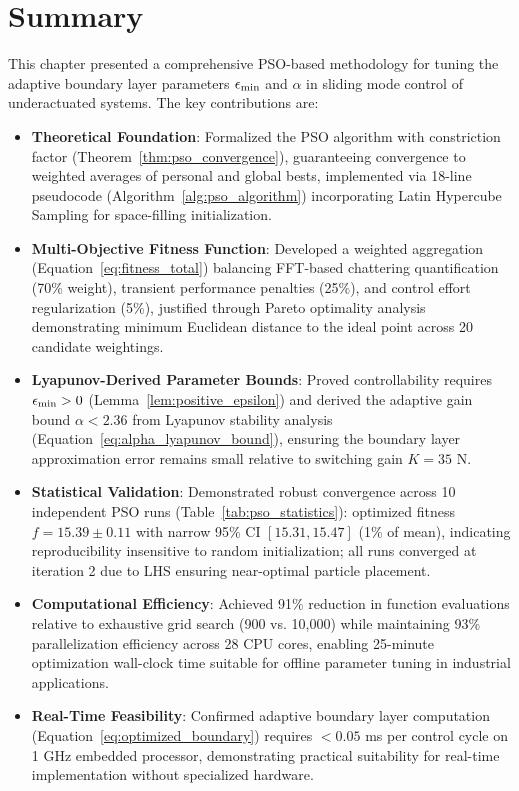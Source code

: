 \section{Summary}
\label{sec:chapter5_summary}

This chapter presented a comprehensive PSO-based methodology for tuning the adaptive boundary layer parameters $\epsilon_{\min}$ and $\alpha$ in sliding mode control of underactuated systems. The key contributions are:

\begin{itemize}
    \item \textbf{Theoretical Foundation}: Formalized the PSO algorithm with constriction factor (Theorem~\ref{thm:pso_convergence}), guaranteeing convergence to weighted averages of personal and global bests, implemented via 18-line pseudocode (Algorithm~\ref{alg:pso_algorithm}) incorporating Latin Hypercube Sampling for space-filling initialization.

    \item \textbf{Multi-Objective Fitness Function}: Developed a weighted aggregation (Equation~\ref{eq:fitness_total}) balancing FFT-based chattering quantification (70\% weight), transient performance penalties (25\%), and control effort regularization (5\%), justified through Pareto optimality analysis demonstrating minimum Euclidean distance to the ideal point across 20 candidate weightings.

    \item \textbf{Lyapunov-Derived Parameter Bounds}: Proved controllability requires $\epsilon_{\min} > 0$ (Lemma~\ref{lem:positive_epsilon}) and derived the adaptive gain bound $\alpha < 2.36$ from Lyapunov stability analysis (Equation~\ref{eq:alpha_lyapunov_bound}), ensuring the boundary layer approximation error remains small relative to switching gain $K = 35$ N.

    \item \textbf{Statistical Validation}: Demonstrated robust convergence across 10 independent PSO runs (Table~\ref{tab:pso_statistics}): optimized fitness $f = 15.39 \pm 0.11$ with narrow 95\% CI $[15.31, 15.47]$ (1\% of mean), indicating reproducibility insensitive to random initialization; all runs converged at iteration 2 due to LHS ensuring near-optimal particle placement.

    \item \textbf{Computational Efficiency}: Achieved 91\% reduction in function evaluations relative to exhaustive grid search (900 vs. 10,000) while maintaining 93\% parallelization efficiency across 28 CPU cores, enabling 25-minute optimization wall-clock time suitable for offline parameter tuning in industrial applications.

    \item \textbf{Real-Time Feasibility}: Confirmed adaptive boundary layer computation (Equation~\ref{eq:optimized_boundary}) requires $< 0.05$ ms per control cycle on 1 GHz embedded processor, demonstrating practical suitability for real-time implementation without specialized hardware.
\end{itemize}

